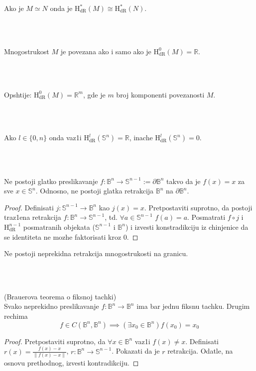 \documentclass[a4paper,12pt]{article}
\newcommand{\RR}{\mathbb{R}}
\newcommand{\norm}[1]{\left\lVert#1\right\rVert}
\newcommand{\hdr}[1]{\mathrm{H}_\mathrm{dR}^{#1}}
\begin{document}
\begin{posl}
Ako je $M \simeq N$ onda je $\hdr{*}(M) \cong \hdr{*}(N)$.
\end{posl}
\\ \\
\begin{nap}
Mnogostrukost $M$ je povezana ako  i samo ako je $\hdr{0} (M) = \RR$. 
\end{nap}
\\ \\
\begin{nap}
Opshtije: $\hdr{0} (M) = \RR^m$, gde je $m$ broj komponenti povezanosti $M$.
\end{nap}
\\ \\
\begin{nap}
Ako $l \in \{0,n\}$ onda vaz1i $\hdr{l} (\mathbb{S}^n) = \RR$, inache $\hdr{l} (\mathbb{S}^n) = 0$.
\end{nap}
\\ \\
\begin{tvr}
Ne postoji glatko preslikavanje $f: \mathbb{B}^n \to \mathbb{S}^{n-1} := \partial \mathbb{B}^n$ takvo da je $f(x) = x$ za sve $x \in \mathbb{S}^n$. Odnosno, ne postoji glatka retrakcija $\mathbb{B}^n$ na $\partial \mathbb{B}^n$.
\end{tvr}
\begin{proof}
Definisati $j: \mathbb{S}^{n-1} \to \mathbb{B}^n$ kao $j(x) = x$. Pretpostaviti suprotno, da postoji traz1ena retrakcija $f: \mathbb{B}^n \to \mathbb{S}^{n-1}$, 
	td. $\forall a \in \mathbb{S}^{n-1}$ $f(a) = a$. Posmatrati $f \circ j$ i $\hdr{n-1}$ posmatranih objekata ($\mathbb{S}^{n-1}$ i $\mathbb{B}^n$) i izvesti konstradikciju
	iz chinjenice da se identiteta ne mozhe faktorisati kroz $0$.
\end{proof}
\begin{nap}
Ne postoji neprekidna retrakcija mnogostrukosti na granicu.
\end{nap}
\\ \\
\begin{tma}
(Brauerova teorema o fiksnoj tachki) \\ Svako neprekidno preslikavanje $f: \mathbb{B}^n \to \mathbb{B}^n$ ima bar jednu fiksnu tachku. Drugim rechima
\[f \in C(\mathbb{B}^n, \mathbb{B}^n) \implies (\exists x_0 \in \mathbb{B}^n) f(x_0) = x_0 \]
\end{tma}
\begin{proof}
Pretpostaviti suprotno, da $\forall x \in \mathbb{B}^n$ vaz1i $f(x) \ne x$. Definisati $r(x) = \frac{f(x) - x}{\norm{f(x) - x}}$, $r: \mathbb{B}^n \to
	\mathbb{S}^{n-1}$. Pokazati da je $r$ retrakcija. Odatle, na osnovu prethodnog, izvesti kontradikciju.
\end{proof}
\end{document}
